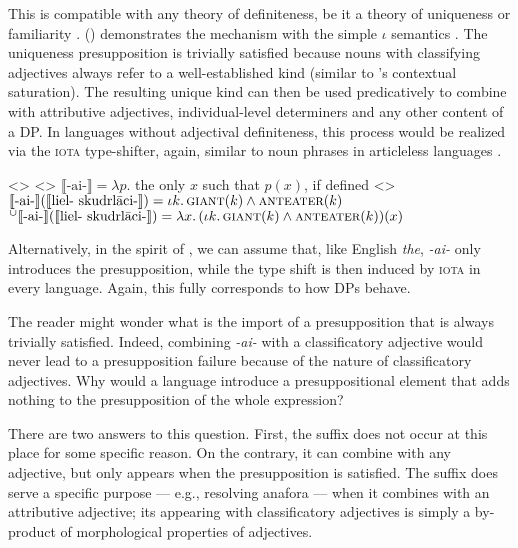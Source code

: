 \documentclass[a4paper, 12pt]{article}
\begin{document}
This is compatible with any theory of definiteness, be it a theory of uniqueness \parencite{russell1905denoting,strawson1950referring} or familiarity \parencite{heim1982semanticsdefiniteindefinite}. (\nextx) demonstrates the mechanism with the simple $\iota$ semantics \parencite{partee1986nounphraseinterpretation}. The uniqueness presupposition is trivially satisfied because nouns with classifying adjectives always refer to a well-established kind (similar to 's contextual saturation). The resulting unique kind can then be used predicatively to combine with attributive adjectives, individual-level determiners and any other content of a DP. In languages without adjectival definiteness, this process would be realized via the \textsc{iota} type-shifter, again, similar to noun phrases in articleless languages \parencite{dayal2004numbermarkingdefiniteness}.

\pex<>
\a<> $\llbracket \text{-ai-} \rrbracket = \lambda p.$ the only $x$ such that $p(x)$, if defined
\a<> $\llbracket \text{-ai-} \rrbracket (\llbracket  \text{liel- skudrlāci-}\rrbracket ) =  \iota k.\,\textsc{giant}(k) \land \textsc{anteater}(k)$
\a $^\cup \llbracket \text{-ai-} \rrbracket(\llbracket \text{liel- skudrlāci-} \rrbracket) = \lambda x.\, (\iota k.\,\textsc{giant}(k) \land \textsc{anteater}(k))(x)$
\xe

Alternatively, in the spirit of \parencite{coppock2015definitenessdeterminacy}, we can assume that, like English \textit{the}, \textit{-ai-} only introduces the presupposition, while the type shift is then induced by \textsc{iota} in every language. Again, this fully corresponds to how DPs behave.

The reader might wonder what is the import of a presupposition that is always trivially satisfied. Indeed, combining \textit{-ai-} with a classificatory adjective would never lead to a presupposition failure because of the nature of classificatory adjectives. Why would a language introduce a presuppositional element that adds nothing to the presupposition of the whole expression?

There are two answers to this question. First, the suffix does not occur at this place for some specific reason. On the contrary, it can combine with any adjective, but only appears when the presupposition is satisfied. The suffix does serve a specific purpose --- e.g., resolving anafora --- when it combines with an attributive adjective; its appearing with classificatory adjectives is simply a by-product of morphological properties of adjectives.
\end{document}
